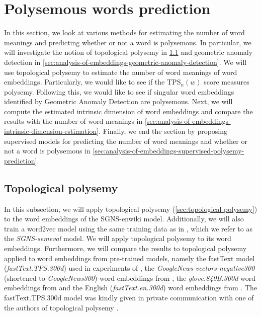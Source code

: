 \section{Polysemous words prediction}
\label{sec:polysemous-words-prediction}
In this section, we look at various methods for estimating the number of word meanings and predicting whether or not a word is polysemous. In particular, we will investigate the notion of topological polysemy in \cref{sec:analysis-of-embeddings-topological-polysemy} and geometric anomaly detection in \cref{sec:analysis-of-embeddings-geometric-anomaly-detection}. We will use topological polysemy to estimate the number of word meanings of word embeddings. Particularly, we would like to see if the $\text{TPS}_n(w)$ score measures polysemy. Following this, we would like to see if singular word embeddings identified by Geometric Anomaly Detection are polysemous. Next, we will compute the estimated intrinsic dimension of word embeddings and compare the results with the number of word meanings in \cref{sec:analysis-of-embeddings-intrinsic-dimension-estimation}. Finally, we end the section by proposing supervised models for predicting the number of word meanings and whether or not a word is polysemous in \cref{sec:analysis-of-embeddings-supervised-polysemy-prediction}.

\subsection{Topological polysemy}
\label{sec:analysis-of-embeddings-topological-polysemy}
In this subsection, we will apply topological polysemy (\cref{sec:topological-polysemy}) to the word embeddings of the SGNS-enwiki model. Additionally, we will also train a word2vec model using the same training data as in \cite{jakubowski2020topology}, which we refer to as the \textit{SGNS-semeval} model. We will apply topological polysemy to its word embeddings. Furthermore, we will compare the results to topological polysemy applied to word embeddings from pre-trained models, namely the fastText model (\textit{fastText.TPS.300d}) used in experiments of \cite{jakubowski2020topology}, the \textit{GoogleNews-vectors-negative300} (shortened to \textit{GoogleNews300}) word embeddings from \cite{GoogleCodeArchiveWord2vec}, the \textit{glove.840B.300d} word embeddings from \cite{GloVeProject2014} and the English (\textit{fastText.en.300d}) word embeddings from \cite{grave2018learning}. The fastText.TPS.300d model was kindly given in private communication with one of the authors of topological polysemy \cite{ZibrowiusPrivComs2021}.

